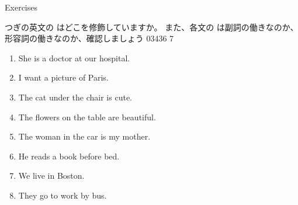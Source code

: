 \documentclass[aspectratio=169,xcolor={dvipsnames,table}]{beamer}
\begin{document}
\begin{frame}[plain]{Exercises}
 
{\small つぎの英文の\,\,はどこを修飾していますか。
また、各文の\,\,は副詞の働きなのか、形容詞の働きなのか、確認しましょう}%
\hfill{\tiny 03436}\,{\scriptsize {}\,7}

\begin{enumerate}
 \item She is a doctor at our hospital.\hfill{}
 \item I want a picture of Paris.\hfill{}
 \item The cat under the chair is cute.\hfill{}
 \item The flowers on the table are beautiful.\hfill{}
 \item The woman in the car is my mother.\hfill{}
 \item He reads a book before bed.\hfill{}
 \item We live in Boston.\hfill{}
 \item They go to work by bus.\hfill{}\\
\hfill{}
\end{enumerate}

\end{frame}

\end{document}
